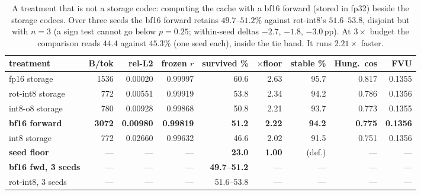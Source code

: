 \begin{table}[htbp]
\caption{A treatment that is not a storage codec: computing the cache with a bf16 forward (stored in fp32) beside the storage codecs. Over three seeds the bf16 forward retains $49.7$--$51.2\%$ against rot-int8's $51.6$--$53.8$, disjoint but with $n=3$ (a sign test cannot go below $p=0.25$; within-seed deltas $-2.7$, $-1.8$, $-3.0$\,pp). At $3\times$ budget the comparison reads $44.4$ against $45.3\%$ (one seed each), inside the tie band. It runs $2.21\times$ faster.}
\label{tab:forward}
\centering\footnotesize
\begin{tabular}{lrrrrrrrr}
\toprule
treatment & B/tok & rel-L2 & frozen $r$ & survived \% & $\times$floor & stable \% & Hung.\ cos & FVU \\
\midrule
fp16 storage & 1536 & 0.00020 & 0.99997 & 60.6 & 2.63 & 95.7 & 0.817 & 0.1355 \\
rot-int8 storage & 772 & 0.00551 & 0.99919 & 53.8 & 2.34 & 94.2 & 0.786 & 0.1356 \\
int8-o8 storage & 780 & 0.00928 & 0.99868 & 50.8 & 2.21 & 93.7 & 0.773 & 0.1355 \\
\textbf{bf16 forward} & \textbf{3072} & \textbf{0.00980} & \textbf{0.99819} & \textbf{51.2} & \textbf{2.22} & \textbf{94.2} & \textbf{0.775} & \textbf{0.1356} \\
int8 storage & 772 & 0.02660 & 0.99632 & 46.6 & 2.02 & 91.5 & 0.751 & 0.1356 \\
\midrule
\textbf{seed floor} & --- & --- & --- & \textbf{23.0} & \textbf{1.00} & (def.) & --- & --- \\
\midrule
\textbf{bf16 fwd, 3 seeds} & --- & --- & --- & \textbf{49.7--51.2} & --- & --- & --- & --- \\
rot-int8, 3 seeds & --- & --- & --- & 51.6--53.8 & --- & --- & --- & --- \\
\bottomrule
\end{tabular}
\end{table}

